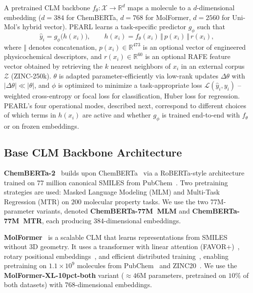 \documentclass[pdflatex,sn-mathphys-num]{sn-jnl}%
\begin{document}
A pretrained CLM backbone $f_\theta : \mathcal{X} \rightarrow \mathbb{R}^{d}$ maps a molecule to a $d$-dimensional embedding ($d=384$ for ChemBERTa, $d=768$ for MolFormer, $d=2560$ for Uni-Mol's hybrid vector). PEARL learns a task-specific predictor $g_\phi$ such that
\begin{equation}
  \hat{y}_i = g_\phi\big(h(x_i)\big), \qquad h(x_i) = f_\theta(x_i) \,\Vert\, p(x_i) \,\Vert\, r(x_i),
\end{equation}
where $\Vert$ denotes concatenation, $p(x_i) \in \mathbb{R}^{473}$ is an optional vector of engineered physicochemical descriptors, and $r(x_i) \in \mathbb{R}^{60}$ is an optional RAFE feature vector obtained by retrieving the $k$ nearest neighbors of $x_i$ in an external corpus $\mathcal{Z}$ (ZINC-250k). $\theta$ is adapted parameter-efficiently via low-rank updates $\Delta\theta$ with $|\Delta\theta| \ll |\theta|$, and $\phi$ is optimized to minimize a task-appropriate loss $\mathcal{L}(\hat y_i, y_i)$ -- weighted cross-entropy or focal loss for classification, Huber loss for regression. PEARL's four operational modes, described next, correspond to different choices of which terms in $h(x_i)$ are active and whether $g_\phi$ is trained end-to-end with $f_\theta$ or on frozen embeddings.

\subsection{Base CLM Backbone Architecture}\label{sec:pretrained_clms}
\textbf{ChemBERTa-2}~\cite{ahmad2022chemberta2} builds upon ChemBERTa~\cite{chithrananda2020chemberta} via a RoBERTa-style architecture trained on $77$ million canonical SMILES from PubChem~\cite{kim2023pubchem}. Two pretraining strategies are used: Masked Language Modeling (MLM) and Multi-Task Regression (MTR) on $200$ molecular property tasks. We use the two 77M-parameter variants, denoted \textbf{ChemBERTa-77M~MLM} and \textbf{ChemBERTa-77M~MTR}, each producing 384-dimensional embeddings.

\textbf{MolFormer}~\cite{ross2022molformer} is a scalable CLM that learns representations from SMILES without 3D geometry. It uses a transformer with linear attention (FAVOR+)~\cite{choromanski2021rethinking}, rotary positional embeddings~\cite{heo2024rotary}, and efficient distributed training~\cite{isard2009distributed}, enabling pretraining on $1.1\times 10^{9}$ molecules from PubChem~\cite{kim2023pubchem} and ZINC20~\cite{irwin2020zinc20}. We use the \textbf{MolFormer-XL-10pct-both} variant ($\approx 46$M parameters, pretrained on $10\%$ of both datasets) with 768-dimensional embeddings.
\end{document}
